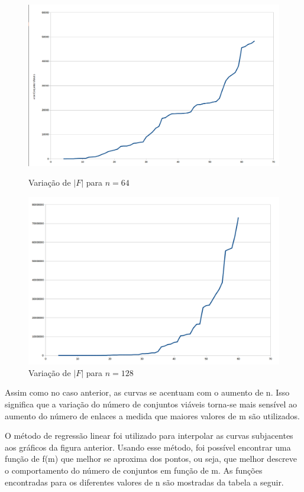 \begin{figure}[ht]
\begin{minipage}[b]{0.5\linewidth}
    \includegraphics[width=1\linewidth]{figs/tamanho64.png} 
    \caption{Variação de $|F|$ para $n=64$} 
    \vspace{4ex}
  \end{minipage}%
  \begin{minipage}[b]{0.5\linewidth}
    \centering
    \includegraphics[width=1\linewidth]{figs/tamanho128.png} 
    \caption{Variação de $|F|$ para $n=128$} 
    \vspace{4ex}
  \end{minipage} 
\end{figure}

Assim como no caso anterior, as curvas se acentuam com o aumento de n. Isso significa que a variação do número de conjuntos viáveis torna-se mais sensível ao aumento do número de enlaces a medida que maiores valores de m são utilizados. 

O método de regressão linear foi utilizado para interpolar as curvas subjacentes aos gráficos da figura anterior. Usando esse método, foi possível encontrar uma função de f(m) que melhor se aproxima dos pontos, ou seja, que melhor descreve o comportamento do número de conjuntos em função de m. As funções encontradas para os diferentes valores de n são mostradas da tabela a seguir.

